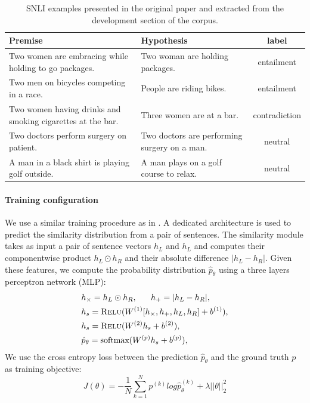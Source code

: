 \begin{table}[!htb]
\centering
\footnotesize
\begin{tabularx}{16cm}{@{}X X c@{} }
  \toprule
Premise & Hypothesis & label \\
\midrule
\midrule 
Two women are embracing while holding to go packages. & Two woman are holding packages. & entailment\\
\rule{0pt}{3ex}Two men on bicycles competing in a race. & People are riding bikes. & entailment\\
\rule{0pt}{3ex}Two women having drinks and smoking cigarettes at the bar. & Three women are at a bar. & contradiction\\
\rule{0pt}{3ex}Two doctors perform surgery on patient. & Two doctors are performing surgery on a man. & neutral\\
\rule{0pt}{3ex}A man in a black shirt is playing golf outside. & A man plays on a golf course to relax. & neutral\\
\bottomrule
\end{tabularx}
\caption{ SNLI examples presented in the original paper \parencite{bowman_15} and extracted from the development section of the corpus.}
\end{table}

\paragraph{Training configuration}

We use a similar training procedure as in \textcite{choi_18}. A dedicated architecture is used to predict the similarity distribution from a pair of sentences. The similarity module takes as input a pair of sentence vectors $h_{L} $ and $h_{L}$ and computes their component\-wise product $h_{L} \odot h_{R}$ and their absolute difference $|h_{L} - h_{R}|$. Given these features, we compute the probability distribution  $\hat{p}_{\theta}$ using a three layers perceptron network (MLP):
\begin{align}
\begin{split}
&h_{\times}=h_L\odot h_R, ~~~~~h_{+} = |h_L - h_R |, \\
&h_s = \textsc{Relu}(W^{(1)}[h_{\times}, h_{+}, h_L, h_R] + b^{(1)}), \\
&h_s = \textsc{Relu}(W^{(2)}h_s + b^{(2)}), \\
&\hat{p}_{\theta} = \text{softmax}(W^{(p)}h_s + b^{(p)}),\\
\end{split}
\end{align}
We use the cross entropy loss between the prediction $\hat{p}_{\theta}$ and the ground truth $p$ as training objective:
\begin{equation}
J(\theta) = -\frac{1}{N}\sum_{k=1}^{N}p^{(k)} log \hat{p}_{\theta}^{(k)} + \lambda||\theta||_{2}^{2}
\end{equation}

